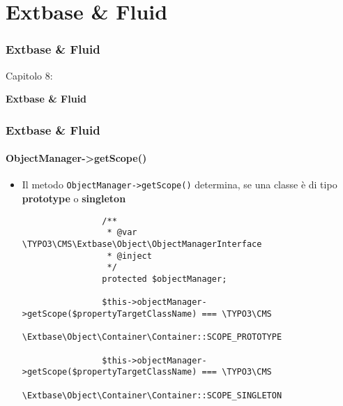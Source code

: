 %

\section{Extbase \& Fluid}
\begin{frame}[fragile]
	\frametitle{Extbase \& Fluid}

	\begin{center}\huge{Capitolo 8:}\end{center}
	\begin{center}\huge{\color{typo3darkgrey}\textbf{Extbase \& Fluid}}\end{center}

\end{frame}


\begin{frame}[fragile]
	\frametitle{Extbase \& Fluid}
	\framesubtitle{ObjectManager->getScope()}

	\lstset{
		basicstyle=\tiny\ttfamily
	}

	\begin{itemize}
		\item Il metodo \texttt{ObjectManager->getScope()} determina,\newline
			se una classe è di tipo \textbf{prototype} o \textbf{singleton}

			\begin{lstlisting}
				/**
				 * @var \TYPO3\CMS\Extbase\Object\ObjectManagerInterface
				 * @inject
				 */
				protected $objectManager;

				$this->objectManager->getScope($propertyTargetClassName) === \TYPO3\CMS
				\Extbase\Object\Container\Container::SCOPE_PROTOTYPE

				$this->objectManager->getScope($propertyTargetClassName) === \TYPO3\CMS
				\Extbase\Object\Container\Container::SCOPE_SINGLETON
			\end{lstlisting}

	\end{itemize}

\end{frame}

